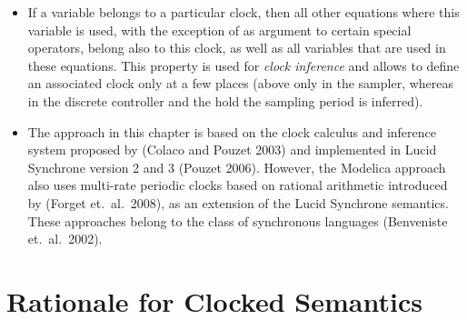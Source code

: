 \begin{itemize}
\item
  If a variable belongs to a particular clock, then all other
  equations where this variable is used, with the exception of as
  argument to certain special operators, belong also to this clock, as
  well as all variables that are used in these equations. This property
  is used for \emph{clock inference} and allows to define an associated
  clock only at a few places (above only in the sampler, whereas in the
  discrete controller and the hold the sampling period is inferred).
\item
  The approach in this chapter is based on the clock calculus and
  inference system proposed by (Colaco and Pouzet 2003) and implemented
  in Lucid Synchrone version 2 and 3 (Pouzet 2006). However, the
  Modelica approach also uses multi-rate periodic clocks based on
  rational arithmetic introduced by (Forget et.~al.\ 2008), as an
  extension of the Lucid Synchrone semantics. These approaches belong to
  the class of synchronous languages (Benveniste et.~al.\ 2002).
\end{itemize}
\section{Rationale for Clocked Semantics}\label{rationale-for-clocked-semantics}

